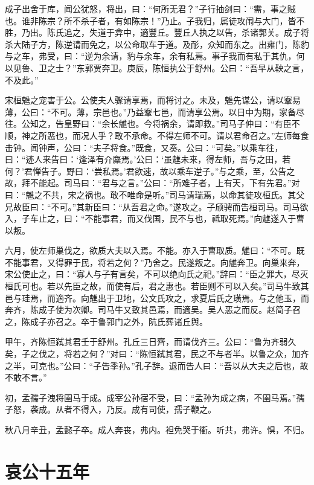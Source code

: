\documentclass[a4paper,12pt,UTF8,twoside]{ctexbook}
\begin{document}
成子出舍于库，闻公犹怒，将出，曰：“何所无君？”子行抽剑曰：“需，事之贼也。谁非陈宗？所不杀子者，有如陈宗！”乃止。子我归，属徒攻闱与大门，皆不胜，乃出。陈氏追之，失道于弇中，適豐丘。豐丘人执之以告，杀诸郭关。成子将杀大陆子方，陈逆请而免之，以公命取车于道。及耏，众知而东之。出雍门，陈豹与之车，弗受，曰：“逆为余请，豹与余车，余有私焉。事子我而有私于其仇，何以见鲁、卫之士？”东郭贾奔卫。庚辰，陈恒执公于舒州。公曰：“吾早从鞅之言，不及此。”

宋桓魋之宠害于公。公使夫人骤请享焉，而将讨之。未及，魋先谋公，请以鞌易薄，公曰：“不可。薄，宗邑也。”乃益鞌七邑，而请享公焉。以日中为期，家备尽往。公知之，告皇野曰：“余长魋也。今将祸余，请即救。”司马子仲曰：“有臣不顺，神之所恶也，而况人乎？敢不承命。不得左师不可。请以君命召之。”左师每食击钟。闻钟声，公曰：“夫子将食。”既食，又奏。公曰：“可矣。”以乘车往，曰：“迹人来告曰：‘逢泽有介麇焉。’公曰：‘虽魋未来，得左师，吾与之田，若何？’君惮告子。野曰：‘尝私焉。’君欲速，故以乘车逆子。”与之乘，至，公告之故，拜不能起。司马曰：“君与之言。”公曰：“所难子者，上有天，下有先君。”对曰：“魋之不共，宋之祸也。敢不唯命是听。”司马请瑞焉，以命其徒攻桓氏。其父兄故臣曰：“不可。”其新臣曰：“从吾君之命。”遂攻之。子颀骋而告桓司马。司马欲入，子车止之，曰：“不能事君，而又伐国，民不与也，祗取死焉。”向魋遂入于曹以叛。

六月，使左师巢伐之，欲质大夫以入焉。不能。亦入于曹取质。魋曰：“不可。既不能事君，又得罪于民，将若之何？”乃舍之。民遂叛之。向魋奔卫。向巢来奔，宋公使止之，曰：“寡人与子有言矣，不可以绝向氏之祀。”辞曰：“臣之罪大，尽灭桓氏可也。若以先臣之故，而使有后，君之惠也。若臣则不可以入矣。”司马牛致其邑与珪焉，而適齐。向魋出于卫地，公文氏攻之，求夏后氏之璜焉。与之他玉，而奔齐，陈成子使为次卿。司马牛又致其邑焉，而適吴。吴人恶之而反。赵简子召之，陈成子亦召之。卒于鲁郭门之外，阬氏葬诸丘舆。

甲午，齐陈恒弑其君壬于舒州。孔丘三日齊，而请伐齐三。公曰：“鲁为齐弱久矣，子之伐之，将若之何？”对曰：“陈恒弑其君，民之不与者半。以鲁之众，加齐之半，可克也。”公曰：“子告季孙。”孔子辞。退而告人曰：“吾以从大夫之后也，故不敢不言。”

初，孟孺子洩将圉马于成。成宰公孙宿不受，曰：“孟孙为成之病，不圉马焉。”孺子怒，袭成。从者不得入，乃反。成有司使，孺子鞭之。

秋八月辛丑，孟懿子卒。成人奔丧，弗内。袒免哭于衢。听共，弗许。惧，不归。


\section{哀公十五年}
\end{document}
